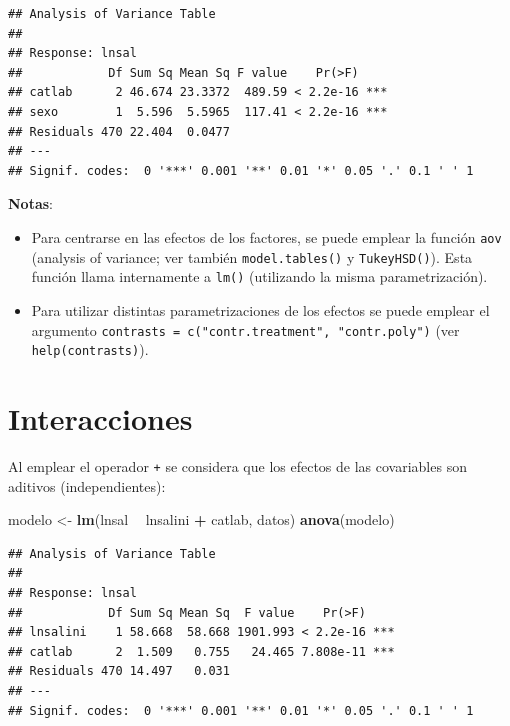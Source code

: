 \documentclass[]{book}
\newenvironment{Shaded}{\begin{snugshade}}{\end{snugshade}}
\newcommand{\KeywordTok}[1]{\textcolor[rgb]{0.13,0.29,0.53}{\textbf{#1}}}
\newcommand{\NormalTok}[1]{#1}
\newcommand{\OperatorTok}[1]{\textcolor[rgb]{0.81,0.36,0.00}{\textbf{#1}}}
\newcommand{\StringTok}[1]{\textcolor[rgb]{0.31,0.60,0.02}{#1}}
\begin{document}
\begin{verbatim}
## Analysis of Variance Table
## 
## Response: lnsal
##            Df Sum Sq Mean Sq F value    Pr(>F)    
## catlab      2 46.674 23.3372  489.59 < 2.2e-16 ***
## sexo        1  5.596  5.5965  117.41 < 2.2e-16 ***
## Residuals 470 22.404  0.0477                      
## ---
## Signif. codes:  0 '***' 0.001 '**' 0.01 '*' 0.05 '.' 0.1 ' ' 1
\end{verbatim}

\textbf{Notas}:

\begin{itemize}
\item
  Para centrarse en las efectos de los factores, se puede emplear la función
  \texttt{aov} (analysis of variance; ver también \texttt{model.tables()} y \texttt{TukeyHSD()}). Esta
  función llama internamente a \texttt{lm()} (utilizando la misma parametrización).
\item
  Para utilizar distintas parametrizaciones de los efectos se puede emplear
  el argumento \texttt{contrasts\ =\ c("contr.treatment",\ "contr.poly")}
  (ver \texttt{help(contrasts)}).
\end{itemize}

\hypertarget{interacciones}{%
\section{Interacciones}\label{interacciones}}

Al emplear el operador \texttt{+} se considera que los efectos de las covariables son aditivos (independientes):

\begin{Shaded}
\begin{Highlighting}[]
\NormalTok{modelo <-}\StringTok{ }\KeywordTok{lm}\NormalTok{(lnsal }\OperatorTok{~}\StringTok{ }\NormalTok{lnsalini }\OperatorTok{+}\StringTok{ }\NormalTok{catlab, datos)}
\KeywordTok{anova}\NormalTok{(modelo)}
\end{Highlighting}
\end{Shaded}

\begin{verbatim}
## Analysis of Variance Table
## 
## Response: lnsal
##            Df Sum Sq Mean Sq  F value    Pr(>F)    
## lnsalini    1 58.668  58.668 1901.993 < 2.2e-16 ***
## catlab      2  1.509   0.755   24.465 7.808e-11 ***
## Residuals 470 14.497   0.031                       
## ---
## Signif. codes:  0 '***' 0.001 '**' 0.01 '*' 0.05 '.' 0.1 ' ' 1
\end{verbatim}
\end{document}
